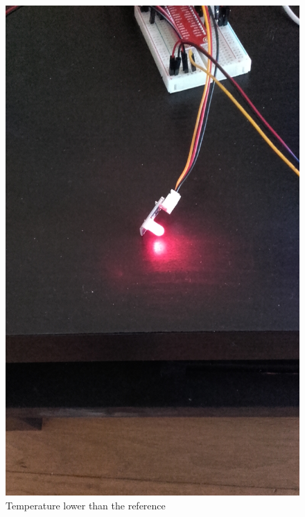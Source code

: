 \documentclass[10pt]{article}
\begin{document}
\begin{figure}[H]
  \centering
  \includegraphics[width=\textwidth]{../imgs/lowTemperature.jpg}
  \caption{\label{lowTemp}Temperature lower than the reference}
\end{figure}
\end{document}
